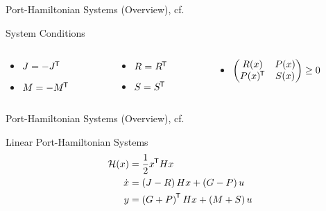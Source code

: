 \begin{frame}{Port-Hamiltonian Systems (Overview), cf.~\cite{VanDerSchaft2014}}
    \begin{block}{System Conditions}
        \begin{columns}[totalwidth=\linewidth]
            \begin{column}{.3\textwidth}
                \begin{itemize}
                    \item $J = -J^{\mkern-1.5mu \mathsf{T}}$
                    \item $M = -M^{\mkern-1.5mu \mathsf{T}}$
                \end{itemize}
            \end{column}
            \begin{column}{.3\textwidth}
                \begin{itemize}
                    \item $R = R^{\mkern-1.5mu \mathsf{T}}$
                    \item $S = S^{\mkern-1.5mu \mathsf{T}}$
                \end{itemize}
            \end{column}
            \begin{column}{.3\linewidth}
                \begin{itemize}
                    \item $\begin{pmatrix}
                        R(x)  & P(x) \\
                        P(x)^{\mkern-1.5mu \mathsf{T}} & S(x)
                    \end{pmatrix} \geq 0$
                \end{itemize}
            \end{column}
        \end{columns}
    \end{block}
\end{frame}

\begin{frame}{Port-Hamiltonian Systems (Overview), cf.~\cite{VanDerSchaft2014}}
    \begin{block}{Linear Port-Hamiltonian Systems}
        \begin{align*}
            \mathcal{H}(x) &= \frac{1}{2} x^{\mkern-1.5mu \mathsf{T}} H x \\
            \dot{x} &= \left( J - R \right) H x + \left( G - P \right) u \\
            y &= \left( G + P \right)^{\mkern-1.5mu \mathsf{T}} H x + \left( M + S \right) u
        \end{align*}
    \end{block}
\end{frame}

